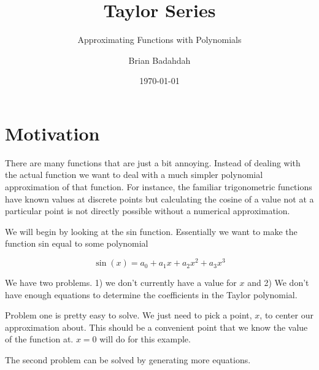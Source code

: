 \documentclass[landscape, twocolumn, 12pt]{article}
\title{Taylor Series}
\subtitle{Approximating Functions with Polynomials}
\author{Brian Badahdah}
\date{\today}
\begin{document}
\maketitle
\section{Motivation}

There are many functions that are just a bit annoying. Instead of dealing with the actual function we want to deal with a much simpler polynomial approximation of that function. For instance, the familiar trigonometric functions have known values at discrete points but calculating the cosine of a value not at a particular point is not directly possible without a numerical approximation.

We will begin by looking at the sin function. Essentially we want to make the function sin equal to some polynomial

\begin{equation}
  \sin(x)=a_0 + a_1x+a_2x^2 + a_3x^3
\end{equation}

We have two problems. 1) we don't currently have a value for $x$ and 2) We don't have enough equations to determine the coefficients in the Taylor polynomial.

Problem one is pretty easy to solve. We just need to pick a point, $x$, to center our approximation about. This should be a convenient point that we know the value of the function at. $x=0$ will do for this example.

The second problem can be solved by generating more equations.


\newpage


\end{document}
